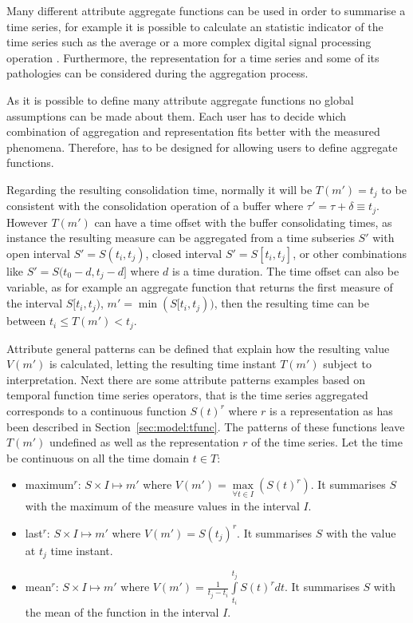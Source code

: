 Many different attribute aggregate functions can be used in order to
summarise a time series, for example it is possible to calculate an
statistic indicator of the time series such as the average or a more
complex digital signal processing operation
\cite{zhang11}. Furthermore, the representation for a time series and
some of its pathologies can be considered during the aggregation
process.


As it is possible to define many attribute aggregate
functions no global assumptions can be made about them. Each user has
to decide which combination of aggregation and representation fits
better with the measured phenomena.  Therefore,  has to be
designed for allowing users to define aggregate functions.





Regarding the resulting consolidation time, normally it will be
$T(m')=t_j$ to be consistent with the consolidation operation of a
buffer where $\tau' = \tau + \delta \equiv t_j$. However $T(m')$ can
have a time offset with the buffer consolidating times, as instance
the resulting measure can be aggregated from a time subseries $S'$
with open interval $S'=S(t_i,t_j)$, closed interval $S'=S[t_i,t_j]$,
or other combinations like $S'=S(t_0-d,t_j-d]$ where $d$ is a time
duration.  The time offset can also be variable, as for example an
aggregate function that returns the first measure of the interval
$S[t_i,t_j)$, $m'=\min(S[t_i,t_j))$, then the resulting time can be
between $t_i \leq T(m') < t_j$.


Attribute general patterns can be defined that explain how the
resulting value $V(m')$ is calculated, letting the resulting time
instant $T(m')$ subject to interpretation.  Next there are some
attribute patterns examples based on temporal function time series
operators, that is the time series aggregated corresponds to a
continuous function $S(t)^r$ where $r$ is a representation as has been
described in Section~\ref{sec:model:tfunc}. The patterns of these
functions leave $T(m')$ undefined as well as the representation $r$ of
the time series. Let the time be continuous on all the time domain
$t\in T$:
\begin{itemize}
\item maximum$^r$: $S \times I \mapsto m'$ where $V(m') =
  \max\limits_{\forall t \in I}(S(t)^r)$. It summarises $S$ with the maximum
  of the measure values in the interval $I$.
\item last$^r$: $S \times I \mapsto m'$ where $V(m') = S(t_j)^r$. It
  summarises $S$ with the value at $t_j$ time instant.
\item mean$^r$: $S \times I \mapsto m'$ where $V(m') =
  \frac{1}{t_j-t_i} \int\limits_{t_i}^{t_j} S(t)^r dt$. It summarises $S$
  with the mean of the function in the interval $I$.
\end{itemize}


